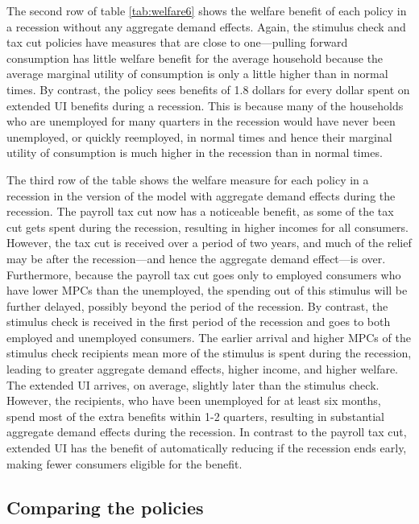 \documentclass[../HAFiscal]{subfiles}
\begin{document}
The second row of table \ref{tab:welfare6} shows the welfare benefit of each policy in a recession without any aggregate demand effects.
Again, the stimulus check and tax cut policies have measures that are close to one---pulling forward consumption has little welfare benefit for the average household because the average marginal utility of consumption is only a little higher than in normal times.
By contrast, the policy sees benefits of 1.8 dollars for every dollar spent on extended UI benefits during a recession.
This is because many of the households who are unemployed for many quarters in the recession would have never been unemployed, or quickly reemployed, in normal times and hence their marginal utility of consumption is much higher in the recession than in normal times.

The third row of the table shows the welfare measure for each policy in a recession in the version of the model with aggregate demand effects during the recession.
The payroll tax cut now has a noticeable benefit, as some of the tax cut gets spent during the recession, resulting in higher incomes for all consumers.
However, the tax cut is received over a period of two years, and much of the relief may be after the recession---and hence the aggregate demand effect---is over.
Furthermore, because the payroll tax cut goes only to employed consumers who have lower MPCs than the unemployed, the spending out of this stimulus will be further delayed, possibly beyond the period of the recession.
By contrast, the stimulus check is received in the first period of the recession and goes to both employed and unemployed consumers.
The earlier arrival and higher MPCs of the stimulus check recipients mean more of the stimulus is spent during the recession, leading to greater aggregate demand effects, higher income, and higher welfare.
The extended UI arrives, on average, slightly later than the stimulus check.
However, the recipients, who have been unemployed for at least six months, spend most of the extra benefits within 1-2 quarters, resulting in substantial aggregate demand effects during the recession.
In contrast to the payroll tax cut, extended UI has the benefit of automatically reducing if the recession ends early, making fewer consumers eligible for the benefit.

\subsection{Comparing the policies}
\whenintegrated{\label{subsec:comparing-the-policies}} 
\end{document}
